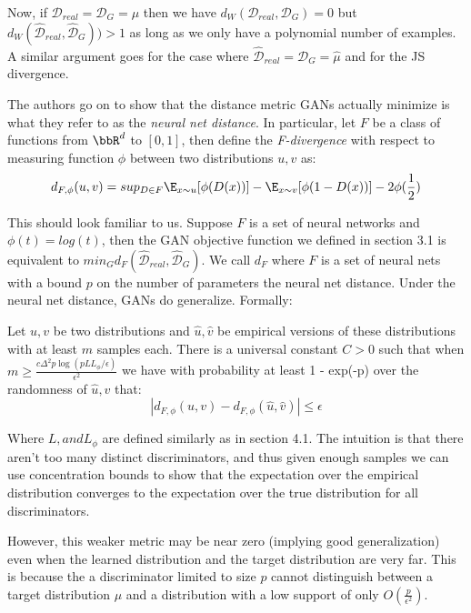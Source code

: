 Now, if $\mathcal{D}_{real} = \mathcal{D}_G = \mu$ then we have $d_{W}(\mathcal{D}_{real}, \mathcal{D}_G) = 0$ but $d_{W}(\hat{\mathcal{D}}_{real}, \hat{\mathcal{D}}_G)) > 1$ as long as we only have a polynomial number of examples. A similar argument goes for the case where $\hat{\mathcal{D}}_{real} = \mathcal{D}_G = \hat{\mu}$ and for the JS divergence.

The authors go on to show that the distance metric GANs actually minimize is what they refer to as the \emph{neural net distance}. In particular, let $F$ be a class of functions from $\bbR^d$ to $[0,1]$, then define the \emph{F-divergence} with respect to measuring function $\phi$ between two distributions $u, v$ as:
$$
d_{F, \phi}(u,v) = sup_{D \in F} \E_{x \sim u}[\phi(D(x))] - \E_{x \sim v}[\phi(1 - D(x))] - 2\phi(\frac{1}{2})
$$

This should look familiar to us. Suppose $F$ is a set of neural networks and $\phi(t) = log(t)$, then the GAN objective function we defined in section 3.1 is equivalent to $min_G d_F(\hat{\mathcal{D}}_{real}, \hat{\mathcal{D}}_G)$. We call $d_F$ where $F$ is a set of neural nets with a bound $p$ on the number of parameters the neural net distance. Under the neural net distance, GANs do generalize. Formally:

\begin{theorem}
Let $u, v$ be two distributions and $\hat{u}, \hat{v}$ be empirical versions of these distributions with at least $m$ samples each. There is a universal constant $C > 0$ such that when $m \geq \frac{c\Delta^2 p \log(p L L_\phi / \epsilon)}{\epsilon^2}$ we have with probability at least 1 - exp(-p) over the randomness of $\hat{u}, \hat{v}$ that:
$$
|d_{F, \phi}(u,v) - d_{F, \phi}(\hat{u}, \hat{v})| \leq \epsilon
$$
\label{thm:gen}
\end{theorem}

Where $L, and L_\phi$ are defined similarly as in section 4.1. The intuition is that there aren't too many distinct discriminators, and thus given enough samples we can use concentration bounds to show that the expectation over the empirical distribution converges to the expectation over the true distribution for all discriminators.

However, this weaker metric may be near zero (implying good generalization) even when the learned distribution and the target distribution are very far. This is because the a discriminator limited to size $p$ cannot distinguish between a target distribution $\mu$ and a distribution with a low support of only $O(\frac{p}{\epsilon^2})$.

